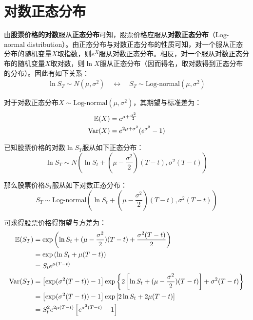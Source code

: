 \documentclass[11pt]{article}
\begin{document}
\section{对数正态分布}

由\textbf{股票价格的对数}服从\textbf{正态分布}可知，股票价格应服从\textbf{对数正态分布}（Log-normal distribution）。由正态分布与对数正态分布的性质可知，对一个服从正态分布的随机变量$X$取指数，则$e^X$服从对数正态分布。相反，对一个服从对数正态分布的随机变量$X$取对数，则$\ln X$服从正态分布（因而得名，取对数得到正态分布的分布）。因此有如下关系：
\begin{align*}
    \ln S_T \sim N(\mu,\sigma^2) \quad \leftrightarrow \quad S_T \sim \text{Log-normal}(\mu,\sigma^2)
\end{align*}

对于对数正态分布$X \sim \text{Log-normal}(\mu,\sigma^2)$，其期望与标准差为：
\begin{align*}
    \mathbb{E}(X) & = e^{\mu+\frac{\sigma^2}{2}} \\
    \operatorname{Var}(X) & = e^{2\mu+\sigma^2} (e^{\sigma^2}-1)
\end{align*}

已知股票价格的对数$\ln S_T$服从如下正态分布：
\begin{equation*}
    \ln S_T  \sim N \left(\ln S_t + (\mu-\frac{\sigma^2}{2})(T-t), \sigma^2(T-t)\right)
\end{equation*}

那么股票价格$S_T$服从如下对数正态分布：
\begin{equation*}
    S_T  \sim \text{Log-normal} \left(\ln S_t + (\mu-\frac{\sigma^2}{2})(T-t), \sigma^2(T-t)\right)
\end{equation*}

可求得股票价格得期望与方差为：
\begin{align*}
    \mathbb{E}(S_T)   & = \exp\left( \ln S_t + (\mu - \frac{\sigma^2}{2})(T-t)+\frac{\sigma^2(T-t)}{2}\right) \\
    & = \exp \left( \ln S_t + \mu(T-t) \right) \\
    & = S_t e^{\mu(T-t)} \\
    \operatorname{Var}(S_T) & = \left[\exp(\sigma^2(T-t))-1\right] \exp \left\{2\left[\ln S_t + (\mu - \frac{\sigma^2}{2})(T-t)\right] + \sigma^2(T-t)\right\} \\
    & = \left[\exp(\sigma^2(T-t))-1\right] \exp\left[2 \ln S_t + 2\mu (T-t)\right] \\
    & = S_t^2 e^{2\mu(T-t)} \left[ e^{\sigma^2 (T-t)} - 1 \right]
\end{align*}
\end{document}
